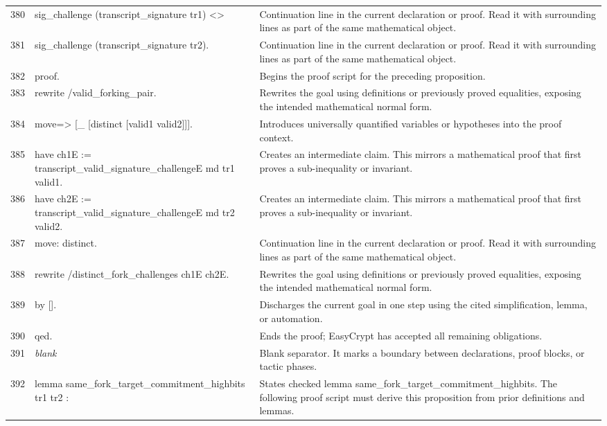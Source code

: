 \documentclass[10pt]{article}
\begin{document}
\begin{longtable}{r L{0.53\textwidth} L{0.37\textwidth}}
380 & {\ttfamily\scriptsize   sig\_challenge (transcript\_signature tr1) <>} & Continuation line in the current declaration or proof.  Read it with surrounding lines as part of the same mathematical object. \\
381 & {\ttfamily\scriptsize   sig\_challenge (transcript\_signature tr2).} & Continuation line in the current declaration or proof.  Read it with surrounding lines as part of the same mathematical object. \\
382 & {\ttfamily\scriptsize proof.} & Begins the proof script for the preceding proposition. \\
383 & {\ttfamily\scriptsize rewrite /valid\_forking\_pair.} & Rewrites the goal using definitions or previously proved equalities, exposing the intended mathematical normal form. \\
384 & {\ttfamily\scriptsize move=> [\_ [distinct [valid1 valid2]]].} & Introduces universally quantified variables or hypotheses into the proof context. \\
385 & {\ttfamily\scriptsize have ch1E := transcript\_valid\_signature\_challengeE md tr1 valid1.} & Creates an intermediate claim.  This mirrors a mathematical proof that first proves a sub-inequality or invariant. \\
386 & {\ttfamily\scriptsize have ch2E := transcript\_valid\_signature\_challengeE md tr2 valid2.} & Creates an intermediate claim.  This mirrors a mathematical proof that first proves a sub-inequality or invariant. \\
387 & {\ttfamily\scriptsize move: distinct.} & Continuation line in the current declaration or proof.  Read it with surrounding lines as part of the same mathematical object. \\
388 & {\ttfamily\scriptsize rewrite /distinct\_fork\_challenges ch1E ch2E.} & Rewrites the goal using definitions or previously proved equalities, exposing the intended mathematical normal form. \\
389 & {\ttfamily\scriptsize by [].} & Discharges the current goal in one step using the cited simplification, lemma, or automation. \\
390 & {\ttfamily\scriptsize qed.} & Ends the proof; EasyCrypt has accepted all remaining obligations. \\
391 & {\ttfamily\scriptsize \emph{blank}} & Blank separator.  It marks a boundary between declarations, proof blocks, or tactic phases. \\
392 & {\ttfamily\scriptsize lemma same\_fork\_target\_commitment\_highbits tr1 tr2 :} & States checked lemma same\_fork\_target\_commitment\_highbits.  The following proof script must derive this proposition from prior definitions and lemmas. \\

\end{longtable}
\end{document}

